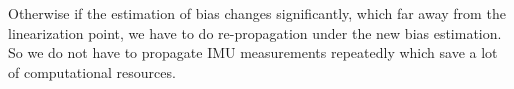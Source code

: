 \documentclass[12pt]{article}   %
\begin{document}
Otherwise if the estimation of bias changes significantly, which far away from the linearization point, we have to do re-propagation under the new bias estimation. So we do not have to propagate IMU measurements repeatedly which save a lot of computational resources.

\end{document}
